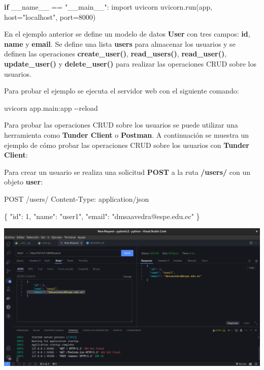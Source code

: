 \documentclass[
  a4paper,
  DIV=11,
  numbers=noendperiod,
  onepage,
  openany]{scrreprt}
\newenvironment{Shaded}{\begin{snugshade}}{\end{snugshade}}
\newcommand{\AttributeTok}[1]{\textcolor[rgb]{0.40,0.45,0.13}{#1}}
\newcommand{\ControlFlowTok}[1]{\textcolor[rgb]{0.00,0.23,0.31}{\textbf{#1}}}
\newcommand{\DecValTok}[1]{\textcolor[rgb]{0.68,0.00,0.00}{#1}}
\newcommand{\ExtensionTok}[1]{\textcolor[rgb]{0.00,0.23,0.31}{#1}}
\newcommand{\ImportTok}[1]{\textcolor[rgb]{0.00,0.46,0.62}{#1}}
\newcommand{\NormalTok}[1]{\textcolor[rgb]{0.00,0.23,0.31}{#1}}
\newcommand{\OperatorTok}[1]{\textcolor[rgb]{0.37,0.37,0.37}{#1}}
\newcommand{\StringTok}[1]{\textcolor[rgb]{0.13,0.47,0.30}{#1}}
\newcommand{\VariableTok}[1]{\textcolor[rgb]{0.07,0.07,0.07}{#1}}
\begin{document}
\begin{Shaded}
\begin{Highlighting}[]
\ControlFlowTok{if} \VariableTok{\_\_name\_\_} \OperatorTok{==} \StringTok{"\_\_main\_\_"}\NormalTok{:}
    \ImportTok{import}\NormalTok{ uvicorn}
\NormalTok{    uvicorn.run(app, host}\OperatorTok{=}\StringTok{"localhost"}\NormalTok{, port}\OperatorTok{=}\DecValTok{8000}\NormalTok{)}
\end{Highlighting}
\end{Shaded}

En el ejemplo anterior se define un modelo de datos \textbf{User} con
tres campos: \textbf{id}, \textbf{name} y \textbf{email}. Se define una
lista \textbf{users} para almacenar los usuarios y se definen las
operaciones \textbf{create\_user()}, \textbf{read\_users()},
\textbf{read\_user()}, \textbf{update\_user()} y \textbf{delete\_user()}
para realizar las operaciones CRUD sobre los usuarios.

Para probar el ejemplo se ejecuta el servidor web con el siguiente
comando:

\begin{Shaded}
\begin{Highlighting}[]
\ExtensionTok{uvicorn}\NormalTok{ app.main:app }\AttributeTok{{-}{-}reload}
\end{Highlighting}
\end{Shaded}

Para probar las operaciones CRUD sobre los usuarios se puede utilizar
una herramienta como \textbf{Tunder Client} o \textbf{Postman}. A
continuación se muestra un ejemplo de cómo probar las operaciones CRUD
sobre los usuarios con \textbf{Tunder Client}:

Para crear un usuario se realiza una solicitud \textbf{POST} a la ruta
\textbf{/users/} con un objeto \textbf{user}:

\begin{Shaded}
\begin{Highlighting}[]
\NormalTok{POST /users/}
\NormalTok{Content{-}Type: application/json}

\NormalTok{\{}
\NormalTok{    "id": 1,}
\NormalTok{    "name": "user1",}
\NormalTok{    "email": "dmsaavedra@espe.edu.ec"}
\NormalTok{\}}
\end{Highlighting}
\end{Shaded}

\includegraphics{unidades/unidad5/images/paste-21.png}
\end{document}
